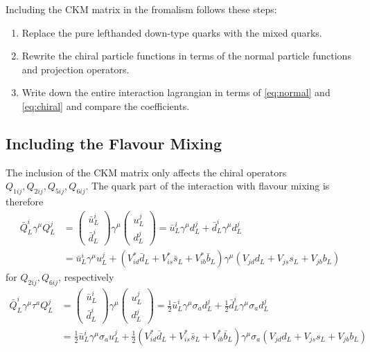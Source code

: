 Including the CKM matrix in the fromalism follows these steps:
\begin{enumerate}
	\item Replace the pure lefthanded down-type quarks with the mixed quarks.
	\item Rewrite the chiral particle functions in terms of the normal particle functions and projection operators.
	\item Write down the entire interaction lagrangian in terms of \eqref{eq:normal} and \eqref{eq:chiral} and compare the coefficients.
\end{enumerate}

\subsection{Including the Flavour Mixing}
The inclusion of the CKM matrix only affects the chiral operators $Q_{1ij},Q_{2ij},Q_{5ij},Q_{6ij}$. The quark part of the interaction with flavour mixing is therefore
\begin{align*}
	\bar{Q}_L^i\gamma^\mu Q_L^j &= \begin{pmatrix}
	\bar{u}_L^i \\ \bar{d}_L^i
	\end{pmatrix}
	\gamma^\mu \begin{pmatrix}
	u_L^j \\ d_L^j
	\end{pmatrix}
	= \bar{u}_L^i\gamma^\mu d_L^j + \bar{d}_L^i\gamma^\mu d_L^j \\
	&= \bar{u}_L^i\gamma^\mu u_L^j + (V_{id}^*\bar{d}_L + V_{is}^*\bar{s}_L+V_{ib}^*\bar{b}_L)\gamma^\mu(V_{jd}d_L+V_{js}s_L+V_{jb}b_L)
\end{align*}
for $Q_{2ij}, Q_{6ij}$, respectively
\begin{align*}
	\bar{Q}_L^i\gamma^\mu\tau^a Q_L^j &=  \begin{pmatrix}
	\bar{u}_L^i \\ \bar{d}_L^i
	\end{pmatrix}
	\gamma^\mu \begin{pmatrix}
	u_L^j \\ d_L^j
	\end{pmatrix}
	= \frac{1}{2}\bar{u}_L^i\gamma^\mu \sigma_a d_L^j + \frac{1}{2}\bar{d}_L^i\gamma^\mu\sigma_a d_L^j \\
	&= \frac{1}{2}\bar{u}_L^i\gamma^\mu \sigma_a u_L^j + \frac{1}{2}(V_{id}^*\bar{d}_L + V_{is}^*\bar{s}_L+V_{ib}^*\bar{b}_L)\gamma^\mu\sigma_a(V_{jd}d_L+V_{js}s_L+V_{jb}b_L)
\end{align*}
